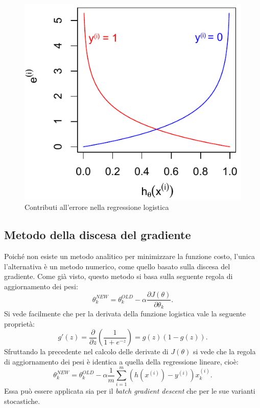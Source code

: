 \begin{figure}[]
\centering
  \includegraphics[width=0.5\columnwidth]{images/errori_logistica}
  \caption{Contributi all'errore nella regressione logistica}
  \label{fig:errori_logistica}
\end{figure}

\subsection{Metodo della discesa del gradiente}
Poiché non esiste un metodo analitico per minimizzare la funzione costo, l'unica l'alternativa è un metodo numerico, come quello basato sulla discesa del gradiente. Come già visto, questo metodo si basa sulla seguente regola di aggiornamento dei pesi:
\begin{equation*}
  \theta_k^{NEW} = \theta_k^{OLD} - \alpha \frac{ \partial J(\theta)}{ \partial \theta_k}.
\end{equation*}
Si vede facilmente che per la derivata della funzione logistica vale la seguente proprietà:
\begin{equation*}
g'(z) = \frac{\partial}{\partial z}\left( \frac{1}{1+e^{-z}}\right)=g(z)(1-g(z)).
\end{equation*}
Sfruttando la precedente nel calcolo delle derivate di $J(\theta)$ si vede che la regola di aggiornamento dei pesi è identica a quella della regressione lineare, cioè:
\begin{equation*}
   \theta_k^{NEW} = \theta_k^{OLD} - \alpha \frac{1}{m} \sum_{i=1}^m (h(x^{(i)})-y^{(i)}) x^{(i)}_k.\end{equation*}
Essa può essere applicata sia per il \emph{batch gradient descent} che per le sue varianti stocastiche.

